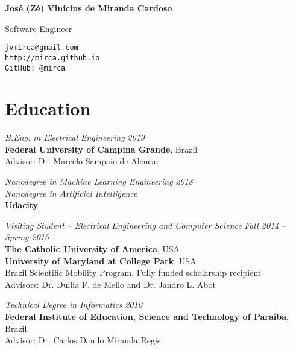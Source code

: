 \documentclass[10pt]{article}
\begin{document}
\pagestyle{empty}
\begin{titlepage}
     {\Large{\textbf{Jos\'e (Z\'e) Vin\'icius de Miranda Cardoso}}}
     \vspace{.5cm}

    \begin{minipage}[b]{8cm}
     Software Engineer\\
    \end{minipage}
    \hfill
    \begin{minipage}[b]{4cm}
        \hfill \texttt{jvmirca@gmail.com}\\
        \texttt{http://mirca.github.io}\\
        \texttt{GitHub: @mirca}
    \end{minipage}


\section*{Education}

\emph{B.Eng. in Electrical Engineering} \hfill \textit{2019} \\
\textbf{Federal University of Campina Grande}, Brazil\\
Advisor: Dr. Marcelo Sampaio de Alencar
\vspace{.5cm}

\emph{Nanodegree in Machine Learning Engineering} \hfill \textit{2018}\\
\emph{Nanodegree in Artificial Intelligence}\\
\textbf{Udacity}
\vspace{.5cm}

\emph{Visiting Student -- Electrical Engineering and Computer Science} \hfill \textit{Fall 2014 -- Spring 2015} \\
\textbf{The Catholic University of America}, USA\\
\textbf{University of Maryland at College Park}, USA \\
Brazil Scientific Mobility Program, Fully funded scholarship recipient \\
Advisors: Dr. Duilia F. de Mello and Dr. Jandro L. Abot
\vspace{.5cm}

\emph{Technical Degree in Informatics} \hfill \textit{2010}\\
\textbf{Federal Institute of Education, Science and Technology of Para\'iba}, Brazil \\
Advisor: Dr. Carlos Danilo Miranda Regis


\end{titlepage}
\end{document}
